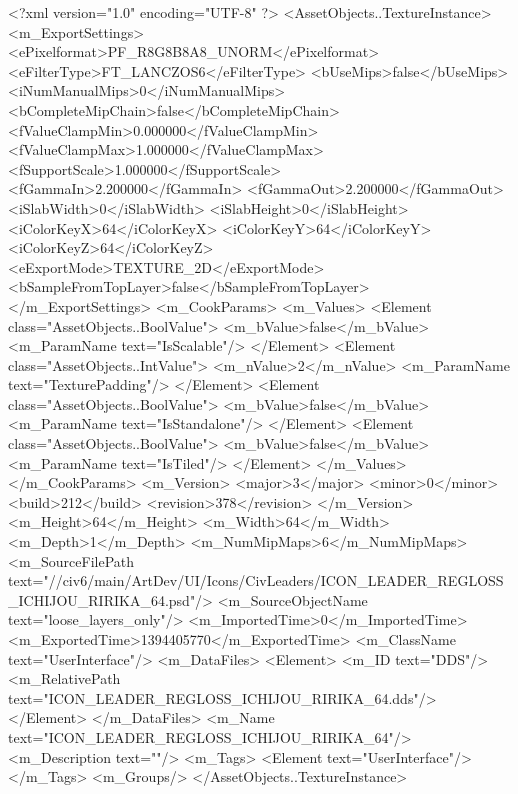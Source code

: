 <?xml version="1.0" encoding="UTF-8" ?>
<AssetObjects..TextureInstance>
	<m_ExportSettings>
		<ePixelformat>PF_R8G8B8A8_UNORM</ePixelformat>
		<eFilterType>FT_LANCZOS6</eFilterType>
		<bUseMips>false</bUseMips>
		<iNumManualMips>0</iNumManualMips>
		<bCompleteMipChain>false</bCompleteMipChain>
		<fValueClampMin>0.000000</fValueClampMin>
		<fValueClampMax>1.000000</fValueClampMax>
		<fSupportScale>1.000000</fSupportScale>
		<fGammaIn>2.200000</fGammaIn>
		<fGammaOut>2.200000</fGammaOut>
		<iSlabWidth>0</iSlabWidth>
		<iSlabHeight>0</iSlabHeight>
		<iColorKeyX>64</iColorKeyX>
		<iColorKeyY>64</iColorKeyY>
		<iColorKeyZ>64</iColorKeyZ>
		<eExportMode>TEXTURE_2D</eExportMode>
		<bSampleFromTopLayer>false</bSampleFromTopLayer>
	</m_ExportSettings>
	<m_CookParams>
		<m_Values>
			<Element class="AssetObjects..BoolValue">
				<m_bValue>false</m_bValue>
				<m_ParamName text="IsScalable"/>
			</Element>
			<Element class="AssetObjects..IntValue">
				<m_nValue>2</m_nValue>
				<m_ParamName text="TexturePadding"/>
			</Element>
			<Element class="AssetObjects..BoolValue">
				<m_bValue>false</m_bValue>
				<m_ParamName text="IsStandalone"/>
			</Element>
			<Element class="AssetObjects..BoolValue">
				<m_bValue>false</m_bValue>
				<m_ParamName text="IsTiled"/>
			</Element>
		</m_Values>
	</m_CookParams>
	<m_Version>
		<major>3</major>
		<minor>0</minor>
		<build>212</build>
		<revision>378</revision>
	</m_Version>
	<m_Height>64</m_Height>
	<m_Width>64</m_Width>
	<m_Depth>1</m_Depth>
	<m_NumMipMaps>6</m_NumMipMaps>
	<m_SourceFilePath text="//civ6/main/ArtDev/UI/Icons/CivLeaders/ICON_LEADER_REGLOSS_ICHIJOU_RIRIKA_64.psd"/>
	<m_SourceObjectName text="loose_layers_only"/>
	<m_ImportedTime>0</m_ImportedTime>
	<m_ExportedTime>1394405770</m_ExportedTime>
	<m_ClassName text="UserInterface"/>
	<m_DataFiles>
		<Element>
			<m_ID text="DDS"/>
			<m_RelativePath text="ICON_LEADER_REGLOSS_ICHIJOU_RIRIKA_64.dds"/>
		</Element>
	</m_DataFiles>
	<m_Name text="ICON_LEADER_REGLOSS_ICHIJOU_RIRIKA_64"/>
	<m_Description text=""/>
	<m_Tags>
		<Element text="UserInterface"/>
	</m_Tags>
	<m_Groups/>
</AssetObjects..TextureInstance>

